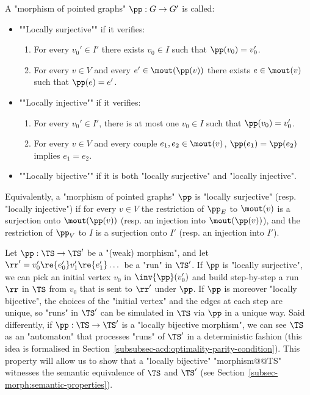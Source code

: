 \documentclass{theoretics}
\begin{document}
\begin{definition}\label{def:loc_bijective_morphisms}
	A "morphism of pointed graphs" $\pp: G \rightarrow G'$ is called:	
	\begin{itemize}
		\item  \AP""Locally surjective"" if it verifies: 
		\begin{enumerate}
			\item For every $v_0'\in I'$ there exists $v_0\in I$ such that $\pp(v_0)=v_0'$.
			\item 
			For every $v\in V$ and every $ e'\in \mout(\pp(v))$
			there exists $e\in \mout(v) $ such that $ \pp(e)=e' $. 
		\end{enumerate}
		
		\item \AP""Locally injective"" if it verifies:
		\begin{enumerate}
			\item For every $v_0'\in I'$, there is at most one $v_0\in I$ such that $\pp(v_0)=v_0'$. 
			
			\item For every $ v\in V$ and every couple $ e_1,e_2\in \mout(v) $,  $\pp(e_1)=\pp(e_2)$ implies $e_1=e_2$.
		\end{enumerate}
		\item \AP""Locally bijective"" if it is both "locally surjective" and "locally injective".
	\end{itemize}
\end{definition}

Equivalently, a "morphism of pointed graphs" $\pp$ is "locally surjective" (resp. "locally injective") if for every $v\in V$ the restriction of $\pp_E$ to $\mout(v)$ is a surjection onto $\mout(\pp(v))$ (resp. an injection into $\mout(\pp(v))$), and the restriction of $\pp_V$ to $I$ is a surjection onto $I'$ (resp. an injection into $I'$).

Let $\pp: \TS \rightarrow \TS'$ be a  "(weak) morphism", and let $\rr'= v_0'\re{e_0'}v_1'\re{e_1'}\dots$ be a "run" in $\TS'$. If $\pp$ is "locally surjective", we can pick an initial vertex $v_0$ in $\inv{\pp}(v_0')$ and build step-by-step a run $\rr$ in $\TS$ from $v_0$ that is sent to $\rr'$ under $\pp$. If $\pp$ is moreover "locally bijective", the choices of the "initial vertex" and the edges at each step are unique, so "runs" in $\TS'$ can be simulated in $\TS$ via $\pp$ in a unique way.
Said differently, if $\pp: \TS \rightarrow \TS'$ is a  "locally bijective morphism", we can see $\TS$ as an "automaton" that processes "runs" of $\TS'$ in a deterministic fashion (this idea is formalised in Section~\ref{subsubsec-acd:optimality-parity-condition}).
This property will allow us to show that a "locally bijective" "morphism@@TS" witnesses the semantic equivalence of $\TS$ and $\TS'$ (see Section~\ref{subsec-morph:semantic-properties}).
\end{document}
